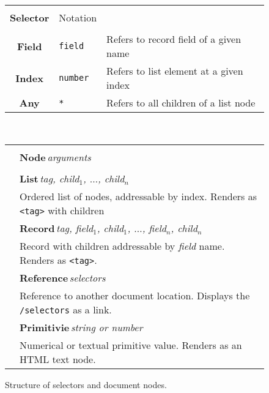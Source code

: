 \documentclass[sigconf]{acmart}
\begin{document}

\begin{figure}
\newcommand{\seltablecol}[3]{
\sffamily\small{\bfseries #2} & {\footnotesize #1} & \footnotesize #3\\
}
\newcommand{\ndtablecol}[4]{
\raisebox{-0.2em}{#1} & \sffamily\small{\bfseries #2}\,\;\textit{\footnotesize #3}\\[-0.2em]
&\sffamily\footnotesize #4\\[0.3em]
}

\begin{tabular}{|clp{18.08em}|}
\hline
\rowcolor{ekgray}
&&\\[-1em]
\rowcolor{ekgray}
\sffamily\small{\bfseries Selector} & {\sffamily\footnotesize Notation} & \\[0.2em]
\hline
&&\\[-1em]
\seltablecol{\Verb|field|}{Field}{Refers to record field of a given name}
\seltablecol{\Verb|number|}{Index}{Refers to list element at a given index}
\seltablecol{\Verb|*|}{Any}{Refers to all children of a list node}
\hline
\end{tabular}

~\\[0.5em]

\begin{tabular}{|cl|}
\hline
\rowcolor{ekgray}
&\\[-1em]
\rowcolor{ekgray}
& \sffamily\small{\bfseries Node}\;\,\textit{\footnotesize arguments} \\[0.2em]
\hline
&\\[-1em]
\ndtablecol{\faListUl}{List}{tag, child$_1$, $\ldots$, child$_n$}
  {Ordered list of nodes, addressable by index. Renders as \Verb|<tag>| with children}
\ndtablecol{\faFileO}{Record}{tag, field$_1$, child$_1$, $\ldots$, field$_n$, child$_n$}
  {Record with children addressable by \textit{field} name. Renders as \Verb|<tag>|.}
\ndtablecol{\faExternalLink}{Reference}{selectors}
  {Reference to another document location. Displays the \Verb|/selectors| as a link.}
\ndtablecol{\faFont}{Primitivie}{string \textnormal{or} number}
  {Numerical or textual primitive value. Renders as an HTML text node.}
\hline
\end{tabular}
\vspace{-0.5em}
\caption{Structure of selectors and document nodes.}
\label{fig:doc}
\end{figure}

\end{document}
